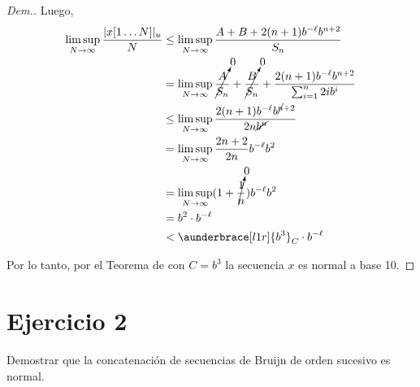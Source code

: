 \documentclass{article}
\theoremstyle{definition} %
\begin{document}
\begin{proof}[Dem.]
    Luego,
    \begin{align*}
        \limsup_{N \to \infty} \frac{|x[1\dots N]|_u}{N}
            &\leq \limsup_{N \to \infty} \frac{A + B + 2(n+1) b^{-\ell} b^{n+2}}{S_n} \\
            &= \limsup_{N \to \infty} \cancelto{0}{\frac{A}{S_n}} +
                \cancelto{0}{\frac{B}{S_n}} +
                \frac{2(n+1) b^{-\ell} b^{n+2}}{\sum_{i=1}^{n}2ib^i} \\
            &\leq \limsup_{N \to \infty} \frac{2(n+1) b^{-\ell} b^{\cancel{n}+2}}{2n\cancel{b^n}} \\
            &= \limsup_{N \to \infty} \frac{2n+2}{2n} b^{-\ell} b^{2} \\
            &= \limsup_{N \to \infty} (1 + \cancelto{0}{\frac{1}{n}}) b^{-\ell} b^{2} \\
            &= b^2 \cdot b^{-\ell} \\
            &< \aunderbrace[l1r]{b^3}_{C} \cdot b^{-\ell}
    \end{align*}

    Por lo tanto, por el Teorema de  con $C =
    b^3$ la secuencia $x$ es normal a base 10.
\end{proof}

\section*{Ejercicio 2}

Demostrar que la concatenación de secuencias de Bruijn de orden sucesivo es
normal.
\end{document}
